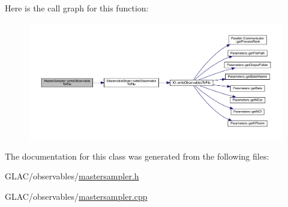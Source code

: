 Here is the call graph for this function\+:
\nopagebreak
\begin{figure}[H]
\begin{center}
\leavevmode
\includegraphics[width=350pt]{class_master_sampler_a638714c38e1a6252ab8b6be1fa224bd4_cgraph}
\end{center}
\end{figure}


The documentation for this class was generated from the following files\+:\begin{DoxyCompactItemize}
\item 
G\+L\+A\+C/observables/\mbox{\hyperlink{mastersampler_8h}{mastersampler.\+h}}\item 
G\+L\+A\+C/observables/\mbox{\hyperlink{mastersampler_8cpp}{mastersampler.\+cpp}}\end{DoxyCompactItemize}
